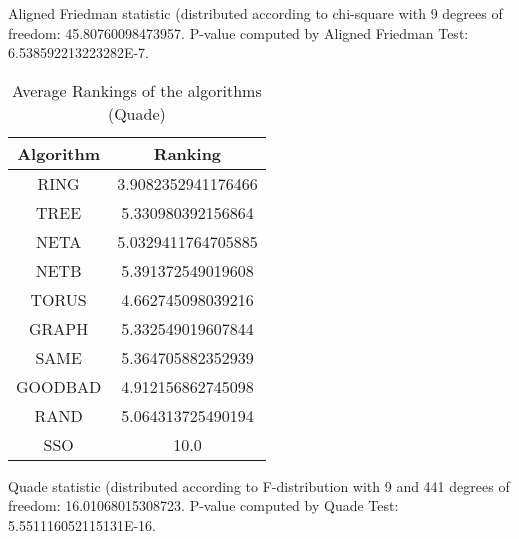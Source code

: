 \documentclass[a4paper,10pt]{article}
\begin{document}
\begin{landscape}
Aligned Friedman statistic (distributed according to chi-square with 9 degrees of freedom: 45.80760098473957. 
P-value computed by Aligned Friedman Test: 6.538592213223282E-7.\newline


\newpage

\begin{table}[!htp]
\centering
\caption{Average Rankings of the algorithms (Quade)
}\begin{tabular}{c|c}
Algorithm&Ranking\\
\hline
 RING&3.9082352941176466\\
 TREE&5.330980392156864\\
 NETA&5.0329411764705885\\
 NETB&5.391372549019608\\
 TORUS&4.662745098039216\\
 GRAPH&5.332549019607844\\
 SAME&5.364705882352939\\
 GOODBAD&4.912156862745098\\
 RAND&5.064313725490194\\
 SSO&10.0\\
\end{tabular}
\end{table}
Quade statistic (distributed according to F-distribution with 9 and 441 degrees of freedom: 16.01068015308723. 
P-value computed by Quade Test: 5.551116052115131E-16.\newline


\newpage


\end{landscape}
\end{document}
